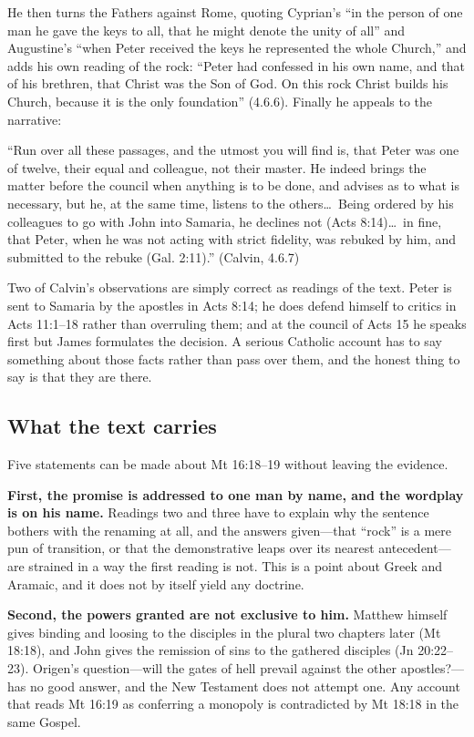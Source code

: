 He then turns the Fathers against Rome, quoting Cyprian's ``in the person of
one man he gave the keys to all, that he might denote the unity of all'' and
Augustine's ``when Peter received the keys he represented the whole Church,''
and adds his own reading of the rock: ``Peter had confessed in his own name,
and that of his brethren, that Christ was the Son of God. On this rock Christ
builds his Church, because it is the only foundation'' (4.6.6). Finally he
appeals to the narrative:

\begin{studyframe}\small
``Run over all these passages, and the utmost you will find is, that Peter
was one of twelve, their equal and colleague, not their master. He indeed
brings the matter before the council when anything is to be done, and advises
as to what is necessary, but he, at the same time, listens to the others\ldots\
Being ordered by his colleagues to go with John into Samaria, he declines not
(Acts 8:14)\ldots\ in fine, that Peter, when he was not acting with strict
fidelity, was rebuked by him, and submitted to the rebuke (Gal. 2:11).''
(Calvin, \work{Institutes} 4.6.7)
\end{studyframe}

Two of Calvin's observations are simply correct as readings of the text.
Peter is sent to Samaria by the apostles in Acts 8:14; he does defend himself
to critics in Acts 11:1--18 rather than overruling them; and at the council
of Acts 15 he speaks first but James formulates the decision. A serious
Catholic account has to say something about those facts rather than pass over
them, and the honest thing to say is that they are there.

\subsection{What the text carries}

Five statements can be made about Mt 16:18--19 without leaving the evidence.

\textbf{First, the promise is addressed to one man by name, and the wordplay
is on his name.} Readings two and three have to explain why the sentence
bothers with the renaming at all, and the answers given---that ``rock'' is a
mere pun of transition, or that the demonstrative leaps over its nearest
antecedent---are strained in a way the first reading is not. This is a point
about Greek and Aramaic, and it does not by itself yield any doctrine.

\textbf{Second, the powers granted are not exclusive to him.} Matthew
himself gives binding and loosing to the disciples in the plural two chapters
later (Mt 18:18), and John gives the remission of sins to the gathered
disciples (Jn 20:22--23). Origen's question---will the gates of hell prevail
against the other apostles?---has no good answer, and the New Testament does
not attempt one. Any account that reads Mt 16:19 as conferring a monopoly is
contradicted by Mt 18:18 in the same Gospel.

